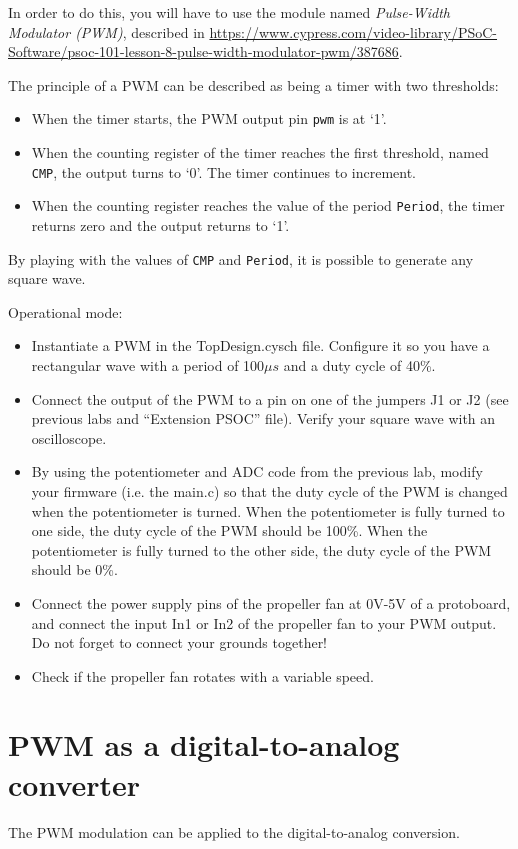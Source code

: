 \documentclass[11pt,a4paper]{article}
\theoremstyle{definition}%
\begin{document}
In order to do this, you will have to use the module named \textit{Pulse-Width Modulator (PWM)}, described in \url{https://www.cypress.com/video-library/PSoC-Software/psoc-101-lesson-8-pulse-width-modulator-pwm/387686}.

The principle of a PWM can be described as being a timer with two thresholds:
\begin{itemize}
	\item When the timer starts, the PWM output pin \texttt{pwm} is at ‘1’.
	\item When the counting register of the timer reaches the first threshold, named \texttt{CMP}, the output turns to ‘0’.
	The timer continues to increment.
	\item When the counting register reaches the value of the period \texttt{Period}, the timer returns zero and the output returns to ‘1’.
\end{itemize}
By playing with the values of \texttt{CMP} and \texttt{Period}, it is possible to generate any square wave.

Operational mode:
\begin{itemize}
	\item Instantiate a PWM in the TopDesign.cysch file. Configure it so you have a rectangular wave with a period of 100$\mu s$ and a duty cycle of 40\%. 
	\item Connect the output of the PWM to a pin on one of the jumpers J1 or J2 (see previous labs and ``Extension PSOC'' file). Verify your square wave with an oscilloscope. 
	\item By using the potentiometer and ADC code from the previous lab, modify your firmware (i.e. the main.c) so that the duty cycle of the PWM is changed when the potentiometer is turned. When the potentiometer is fully turned to one side, the duty cycle of the PWM should be 100\%. When the potentiometer is fully turned to the other side, the duty cycle of the PWM should be 0\%. 
	\item Connect the power supply pins of the propeller fan at 0V-5V of a protoboard, and connect the input In1 or In2 of the propeller fan to your PWM output.
	Do not forget to connect your grounds together!
	\item Check if the propeller fan rotates with a variable speed.
\end{itemize}






\section{PWM as a digital-to-analog converter}
The PWM modulation can be applied to the digital-to-analog conversion.
\end{document}
